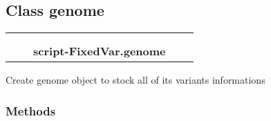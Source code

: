 

\subsection{Class genome}

    \label{script-FixedVar:genome}
\begin{tabular}{cccccc}
\multicolumn{2}{r}{\settowidth{\BCL}{object}\multirow{2}{\BCL}{object}}
&&
  \\\cline{3-3}
  &&\multicolumn{1}{c|}{}
&&
  \\
&&\multicolumn{2}{l}{\textbf{script-FixedVar.genome}}
\end{tabular}

Create genome object to stock all of its variants informations



  \subsubsection{Methods}

    \vspace{0.5ex}

